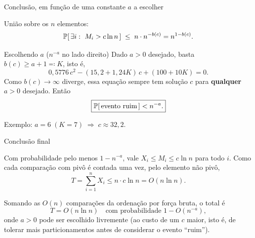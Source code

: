 \documentclass[aspectratio=169]{beamer}
\begin{document}
\begin{frame}{Conclusão, em função de uma constante $a$ a escolher}
 
  União sobre os $n$ elementos:
  \[
    \ProbE{\exists i:\ M_i>c\ln n}\;\leq\;n\cdot n^{-b(c)}
    =n^{1-b(c)}.
  \]
 
  \vfill
 
  \begin{alertblock}{Escolhendo $a$ ($n^{-a}$ no lado direito)}
    Dado $a>0$ desejado, basta $b(c)\geq a+1\eqqcolon K$, isto é,
    \[
      0{,}5776\,c^2-(15{,}2+1{,}24K)\,c+(100+10K)=0.
    \]
    Como $b(c)\to\infty$ diverge, essa equação sempre tem
    solução $c$ para \textbf{qualquer} $a>0$ desejado. Então
    \[
      \boxed{\ProbE{\text{evento ruim}} < n^{-a}.}
    \]
  \end{alertblock}
 
  \vfill\small
  Exemplo: $a=6\;(K=7)\;\Rightarrow\;c\approx32{,}2$.
 
\end{frame}
 
\begin{frame}{Conclusão final}
 
  Com probabilidade pelo menos $1-n^{-a}$, vale
  $X_i\leq M_i\leq c\ln n$ para todo $i$. Como cada comparação com
  pivô é contada uma vez, pelo elemento não pivô,
  \[
    T=\sum_{i=1}^nX_i\leq n\cdot c\ln n=O(n\ln n).
  \]
 
  \vfill
 
  Somando as $O(n)$ comparações da ordenação por força bruta, o total
  é
  \[
    T=O(n\ln n) \quad\text{com probabilidade } 1-O(n^{-a}),
  \]
  onde $a>0$ pode ser escolhido livremente (ao custo de um $c$ maior,
  isto é, de tolerar mais particionamentos antes de considerar o
  evento ``ruim'').
 
\end{frame}
 
\end{document}

